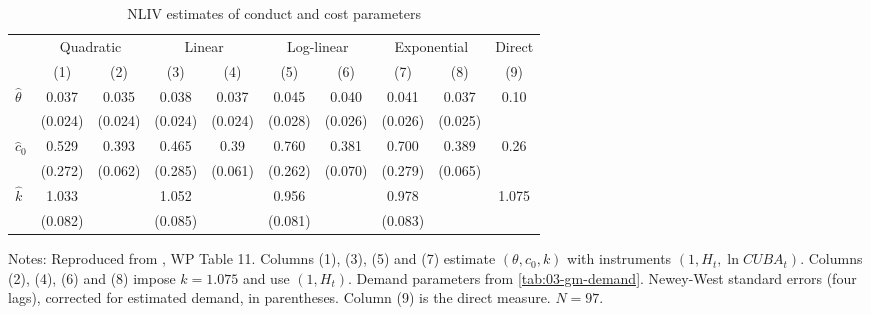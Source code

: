 \begin{table}[htbp]
\centering
\caption{NLIV estimates of conduct and cost parameters}\label{tab:03-gm-nliv}
\small
\setlength{\tabcolsep}{4.5pt}
\begin{tabular}{@{}lccccccccc@{}}
\toprule
 & \multicolumn{2}{c}{Quadratic} & \multicolumn{2}{c}{Linear} & \multicolumn{2}{c}{Log-linear} &
 \multicolumn{2}{c}{Exponential} & Direct\\
\cmidrule(lr){2-3}\cmidrule(lr){4-5}\cmidrule(lr){6-7}\cmidrule(lr){8-9}\cmidrule(l){10-10}
 & (1) & (2) & (3) & (4) & (5) & (6) & (7) & (8) & (9)\\
\midrule
$\hat\theta$ & 0.037 & 0.035 & 0.038 & 0.037 & 0.045 & 0.040 & 0.041 & 0.037 & 0.10\\
 & (0.024) & (0.024) & (0.024) & (0.024) & (0.028) & (0.026) & (0.026) & (0.025) & \\
$\hat c_0$ & 0.529 & 0.393 & 0.465 & 0.39 & 0.760 & 0.381 & 0.700 & 0.389 & 0.26\\
 & (0.272) & (0.062) & (0.285) & (0.061) & (0.262) & (0.070) & (0.279) & (0.065) & \\
$\hat k$ & 1.033 & & 1.052 & & 0.956 & & 0.978 & & 1.075\\
 & (0.082) & & (0.085) & & (0.081) & & (0.083) & & \\
\bottomrule
\end{tabular}

\smallskip
\begin{minipage}{0.92\textwidth}\footnotesize
Notes: Reproduced from \citet{GenesoveMullin1995}, WP Table 11. Columns (1), (3), (5) and (7) estimate
$(\theta, c_0, k)$ with instruments $(1, H_t, \ln\mathit{CUBA}_t)$. Columns (2), (4), (6) and (8) impose $k =
1.075$ and use $(1, H_t)$. Demand parameters from \cref{tab:03-gm-demand}. Newey-West standard errors (four
lags), corrected for estimated demand, in parentheses. Column (9) is the direct measure. $N = 97$.
\end{minipage}
\end{table}

